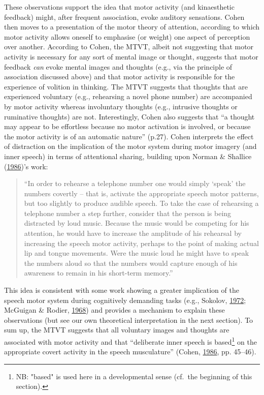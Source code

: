 \documentclass[a4paper,12pt,twoside,onecolumn,openright,final,oldfontcommands]{memoir}
\let\rmarkdownfootnote\footnote%
\def\footnote{\protect\rmarkdownfootnote}
\begin{document}
These observations support the idea that motor activity (and kinaesthetic feedback) might, after frequent association, evoke auditory sensations. Cohen then moves to a presentation of the motor theory of attention, according to which motor activity allows oneself to emphasise (or weight) one aspect of perception over another. According to Cohen, the MTVT, albeit not suggesting that motor activity is necessary for any sort of mental image or thought, suggests that motor feedback \emph{can} evoke mental images and thoughts (e.g., via the principle of association discussed above) and that motor activity is responsible for the experience of volition in thinking. The MTVT suggests that thoughts that are experienced voluntary (e.g., rehearsing a novel phone number) are accompanied by motor activity whereas involuntary thoughts (e.g., intrusive thoughts or ruminative thoughts) are not. Interestingly, Cohen also suggests that \enquote{a thought may appear to be effortless because no motor activation is involved, or because the motor activity is of an automatic nature} (p.27). Cohen interprets the effect of distraction on the implication of the motor system during motor imagery (and inner speech) in terms of attentional sharing, building upon Norman \& Shallice (\protect\hyperlink{ref-norman_attention_1986}{1986})'s work:

\begin{quote}
\enquote{In order to rehearse a telephone number one would simply \enquote{speak} the numbers covertly -- that is, activate the appropriate speech motor patterns, but too slightly to produce audible speech. To take the case of rehearsing a telephone number a step further, consider that the person is being distracted by loud music. Because the music would be competing for his attention, he would have to increase the amplitude of his rehearsal by increasing the speech motor activity, perhaps to the point of making actual lip and tongue movements. Were the music loud he might have to speak the numbers aloud so that the numbers would capture enough of his awareness to remain in his short-term memory.}
\end{quote}

This idea is consistent with some work showing a greater implication of the speech motor system during cognitively demanding tasks (e.g., Sokolov, \protect\hyperlink{ref-sokolov_inner_1972}{1972}; McGuigan \& Rodier, \protect\hyperlink{ref-mcguigan_effects_1968}{1968}) and provides a mechanism to explain these observations (but see our own theoretical interpretation in the next section). To sum up, the MTVT suggests that all voluntary images and thoughts are associated with motor activity and that \enquote{deliberate inner speech is based\footnote{NB: "based" is used here in a developmental sense (cf.~the beginning of this section).} on the appropriate covert activity in the speech musculature} (Cohen, \protect\hyperlink{ref-cohen_motor_1986}{1986}, pp. 45--46).
\end{document}
